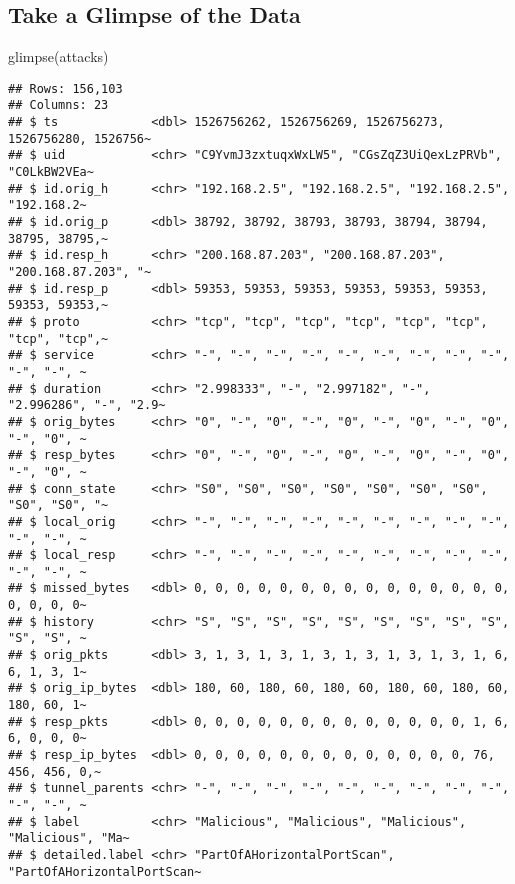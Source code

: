 \documentclass[
]{article}
\newenvironment{Shaded}{\begin{snugshade}}{\end{snugshade}}
\newcommand{\FunctionTok}[1]{\textcolor[rgb]{0.00,0.00,0.00}{#1}}
\newcommand{\NormalTok}[1]{#1}
\begin{document}
\hypertarget{take-a-glimpse-of-the-data}{%
\subsection{Take a Glimpse of the
Data}\label{take-a-glimpse-of-the-data}}

\begin{Shaded}
\begin{Highlighting}[]
\FunctionTok{glimpse}\NormalTok{(attacks)}
\end{Highlighting}
\end{Shaded}

\begin{verbatim}
## Rows: 156,103
## Columns: 23
## $ ts             <dbl> 1526756262, 1526756269, 1526756273, 1526756280, 1526756~
## $ uid            <chr> "C9YvmJ3zxtuqxWxLW5", "CGsZqZ3UiQexLzPRVb", "C0LkBW2VEa~
## $ id.orig_h      <chr> "192.168.2.5", "192.168.2.5", "192.168.2.5", "192.168.2~
## $ id.orig_p      <dbl> 38792, 38792, 38793, 38793, 38794, 38794, 38795, 38795,~
## $ id.resp_h      <chr> "200.168.87.203", "200.168.87.203", "200.168.87.203", "~
## $ id.resp_p      <dbl> 59353, 59353, 59353, 59353, 59353, 59353, 59353, 59353,~
## $ proto          <chr> "tcp", "tcp", "tcp", "tcp", "tcp", "tcp", "tcp", "tcp",~
## $ service        <chr> "-", "-", "-", "-", "-", "-", "-", "-", "-", "-", "-", ~
## $ duration       <chr> "2.998333", "-", "2.997182", "-", "2.996286", "-", "2.9~
## $ orig_bytes     <chr> "0", "-", "0", "-", "0", "-", "0", "-", "0", "-", "0", ~
## $ resp_bytes     <chr> "0", "-", "0", "-", "0", "-", "0", "-", "0", "-", "0", ~
## $ conn_state     <chr> "S0", "S0", "S0", "S0", "S0", "S0", "S0", "S0", "S0", "~
## $ local_orig     <chr> "-", "-", "-", "-", "-", "-", "-", "-", "-", "-", "-", ~
## $ local_resp     <chr> "-", "-", "-", "-", "-", "-", "-", "-", "-", "-", "-", ~
## $ missed_bytes   <dbl> 0, 0, 0, 0, 0, 0, 0, 0, 0, 0, 0, 0, 0, 0, 0, 0, 0, 0, 0~
## $ history        <chr> "S", "S", "S", "S", "S", "S", "S", "S", "S", "S", "S", ~
## $ orig_pkts      <dbl> 3, 1, 3, 1, 3, 1, 3, 1, 3, 1, 3, 1, 3, 1, 6, 6, 1, 3, 1~
## $ orig_ip_bytes  <dbl> 180, 60, 180, 60, 180, 60, 180, 60, 180, 60, 180, 60, 1~
## $ resp_pkts      <dbl> 0, 0, 0, 0, 0, 0, 0, 0, 0, 0, 0, 0, 0, 1, 6, 6, 0, 0, 0~
## $ resp_ip_bytes  <dbl> 0, 0, 0, 0, 0, 0, 0, 0, 0, 0, 0, 0, 0, 76, 456, 456, 0,~
## $ tunnel_parents <chr> "-", "-", "-", "-", "-", "-", "-", "-", "-", "-", "-", ~
## $ label          <chr> "Malicious", "Malicious", "Malicious", "Malicious", "Ma~
## $ detailed.label <chr> "PartOfAHorizontalPortScan", "PartOfAHorizontalPortScan~
\end{verbatim}
\end{document}
